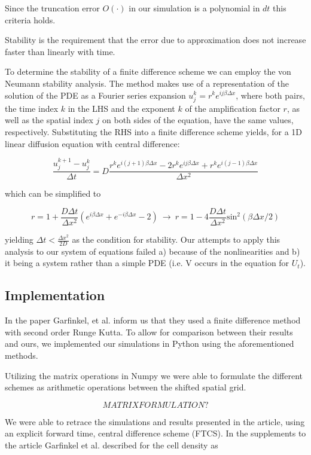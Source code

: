 \documentclass[12pt]{article}
\begin{document}
 Since the truncation error $O(\cdot)$ in our simulation is a polynomial in $dt$ this criteria holds.
 
 
 Stability is the requirement that the error due to approximation does not increase faster than linearly with time. 
 
 To determine the stability of a finite difference scheme we can employ the von Neumann stability analysis. The method makes use of a representation of the solution of the PDE as a Fourier series expansion $u_j^k=r^ke^{ij\beta \Delta x}$, where both pairs, the time index $k$ in the LHS and the exponent $k$ of the amplification factor $r$, as well as the spatial index $j$ on both sides of the equation, have the same values, respectively. Substituting the RHS into a finite difference scheme yields, for a 1D linear diffusion equation with central difference:
 
 $$\frac{u_j^{k+1}-u_j^k}{\Delta t} = D\frac{r^ke^{i(j+1)\beta \Delta x}-2r^ke^{ij\beta \Delta x}+r^ke^{i(j-1)\beta \Delta x}}{\Delta x^2}$$
 
 \medskip
 which can be simplified to
 \smallskip
 
 $$r=1+\frac{D \Delta t}{\Delta x^2}(e^{i\beta \Delta x}+e^{-i\beta \Delta x}-2)\ \to\ r=1-4\frac{D \Delta t}{\Delta x^2} \mathrm{sin}^2(\beta\Delta x/2)$$
 \smallskip
 
 yielding $\Delta t < \frac{\Delta x^2}{2D}$ as the condition for stability. Our attempts to apply this analysis to our system of equations failed a) because of the nonlinearities and b) it being a system rather than a simple PDE (i.e. V occurs in the equation for $U_t$).
 
 \subsection{Implementation}
 
 In the paper Garfinkel, et al. inform us that they used a finite difference method with second order Runge Kutta. To allow for comparison between their results and ours, we implemented our simulations in Python using the aforementioned methods.
 
 Utilizing the matrix operations in Numpy we were able to formulate the different schemes as arithmetic operations between the shifted spatial grid.
 
 $$MATRIX FORMULATION?$$
 
 We were able to retrace the simulations and results presented in the article, using an explicit forward time, central difference scheme (FTCS). In the supplements to the article Garfinkel et al. described for the cell density as
 
\end{document}
